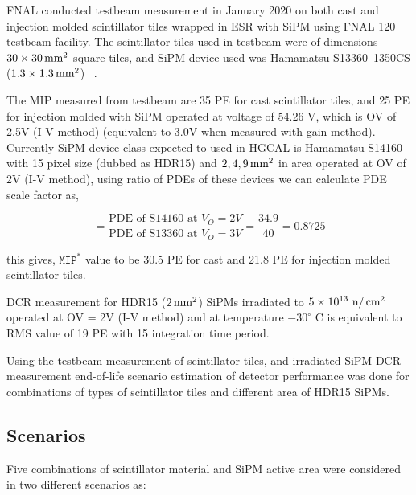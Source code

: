 \gls{FNAL} conducted testbeam measurement in January 2020 on both cast and injection
molded scintillator tiles wrapped in \gls{ESR} with \gls{SiPM}
using \gls{FNAL} 120 \GeV{} testbeam facility. The scintillator tiles
used in testbeam were of dimensions \( 30 \times 30 \,\text{mm}{}^{2} \) square tiles,
and \gls{SiPM} device used was Hamamatsu S13360--1350CS (\( 1.3 \times 1.3 \,\text{mm}{}^{2} \))
~\cite{testbeam-fnal-2020}.

The \gls{MIP} measured from testbeam are 35 \gls{PE} for cast scintillator tiles,
and 25 \gls{PE} for injection molded with \gls{SiPM} operated at
voltage of 54.26 V, which is \gls{OV} of 2.5V (I-V method) (equivalent
to 3.0V when measured with gain method).
Currently \gls{SiPM} device class expected to used in \gls{HGCAL}
is Hamamatsu S14160 with 15\micron{} pixel size (dubbed as HDR15)
and \(2, 4, 9 \,\text{mm}{}^{2} \) in
area operated at \gls{OV} of 2V (I-V method),
using ratio of \glspl{PDE} of these devices
we can calculate PDE scale factor as,

\begin{equation}
  = \frac{\text{PDE of S14160 at } V_O = 2V}
  {\text{PDE of S13360 at } V_O = 3V}
  = \frac{34.9}{40}
  = 0.8725
\end{equation}

this gives, \( \texttt{MIP}^{*} \) value to be 30.5 \gls{PE} for cast
and 21.8 \gls{PE} for injection molded scintillator tiles.

\gls{DCR} measurement for HDR15 (\( 2 \,\text{mm}{}^2 \)) \glspl{SiPM}
irradiated to \( 5 \times {10}^{13} \text{ n}/\,\text{cm}{}^2 \)
operated at \gls{OV} = 2V (I-V method) and at temperature \( -30^{\circ} \text{ C}\)
is equivalent to \gls{RMS} value of 19 \gls{PE} with 15 \nanoseconds{} integration time
period.

Using the testbeam measurement of scintillator tiles, and irradiated \gls{SiPM}
\gls{DCR} measurement end-of-life scenario estimation of
detector performance was done for combinations
of types of scintillator tiles and different area of HDR15 \glspl{SiPM}.

\subsection{
  Scenarios
}

Five combinations of scintillator material and \gls{SiPM} active area
were considered in two different scenarios as:

